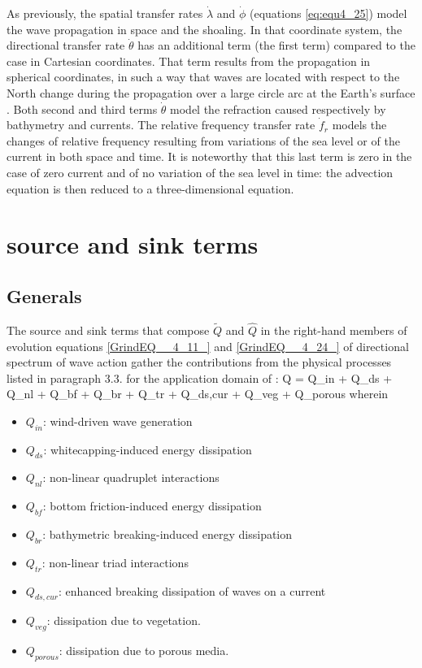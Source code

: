  As previously, the spatial transfer rates $\dot{\lambda }$ and $\dot{\phi }$ (equations \ref{eq:equ4_25}) model the wave propagation in space and the shoaling. In that coordinate system, the directional transfer rate $\dot{\theta }$ has an additional term (the first term) compared to the case in Cartesian coordinates. That term results from the propagation in spherical coordinates, in such a way that waves are located with respect to the North change during the propagation over a large circle arc at the Earth's surface \cite{Wamdi1988} \cite{Komen1994}. Both second and third terms $\dot{\theta }$ model the refraction caused respectively by bathymetry and currents. The relative frequency transfer rate $\dot{f}_{r} $  models the changes of relative frequency resulting from variations of the sea level or of the current in both space and time. It is noteworthy that this last term is zero in the case of zero current and of no variation of the sea level in time: the advection equation is then reduced to a three-dimensional equation.


\section{ \tomawac source and sink terms}
\label{se:sourceterm}

\subsection{ Generals}

 The source and sink terms that compose $\tilde{Q}$ and $\hat{Q}$ in the right-hand members of evolution equations \eqref{GrindEQ__4_11_} and \eqref{GrindEQ__4_24_} of directional spectrum of wave action gather the contributions from the physical processes listed in paragraph 3.3. for the application domain of \tomawac:
\bequ
\label{eq:semimp}
 Q = Q_{in} + Q_{ds} + Q_{nl} + Q_{bf} + Q_{br} + Q_{tr} + Q_{ds,cur} + Q_{veg} + Q_{porous}
\eequ
 wherein 
\begin{itemize}
\item $Q_{in}$: wind-driven wave generation
\item $Q_{ds}$: whitecapping-induced energy dissipation
\item $Q_{nl}$: non-linear quadruplet interactions
\item $Q_{bf}$: bottom friction-induced energy dissipation
\item $Q_{br}$: bathymetric breaking-induced energy dissipation
\item $Q_{tr}$: non-linear triad interactions
\item $Q_{ds,cur}$: enhanced breaking dissipation of waves on a current
\item $Q_{veg}$: dissipation due to vegetation.
\item $Q_{porous}$: dissipation due to porous media.
\end{itemize}

